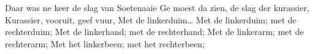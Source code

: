 \beginverse*
Daar was ne keer de slag van Soetenaaie
Ge moest da zien, de slag der kurassier,
Kurassier, vooruit, geef vuur,
Met de linkerduim… 
\endverse
\beginchorus
Met de linkerduim; met de rechterduim;
Met de linkerhand; met de rechterhand;
Met de linkerarm; met de rechterarm;
Met het linkerbeen; met het rechterbeen; 
\endchorus
\endsong